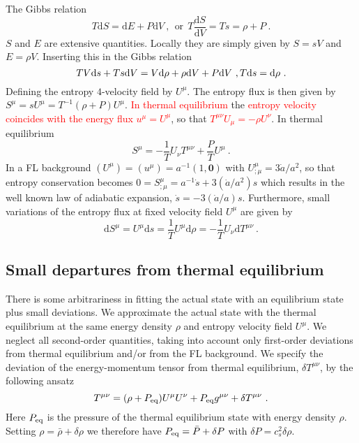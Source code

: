 \documentclass[11pt,a4paper]{article}
\renewcommand{\vec}[1]{\boldsymbol{#1}}
\newcommand{\dif}{\mathrm{d}}
\begin{document}
The Gibbs relation 
\begin{equation}
T \dif S = \dif E + P\dif V ~, ~~ \text{or} ~~ T \dfrac{\dif S}{\dif V} = T s = \rho +P ~.
\end{equation}
$S$ and $E$ are extensive quantities. Locally they are simply given by $S = s V$ and $E = \rho V$. Inserting this in the Gibbs relation
\begin{equation}
T V \dif s + Ts \dif V = V \dif \rho +\rho \dif V + P \dif V ~, \\
T \dif s = \dif \rho ~.
\end{equation}
Defining the entropy $4$-velocity field by $U^\mu$. The entropy flux is then given by $S^\mu  = sU^\mu = T^{-1}(\rho + P)U^\mu$. \textcolor{red}{In thermal equilibrium} the \textcolor{red}{entropy velocity coincides with the energy flux $u^\mu = U^\mu$}, so that \textcolor{red}{$T^{\mu\nu}U_\mu = -\rho U^\nu$}. In thermal equilibrium
\begin{equation}
S^\mu = -\dfrac{1}{T} U_\nu T^{\mu\nu} + \dfrac{P}{T} U^\mu ~.
\end{equation}
In a FL background $(U^\mu) = (u^\mu) = a^{-1}(1, \vec{0})$ with $U^\mu_{;\mu} = 3\dot{a}/a^2$, so that entropy conservation becomes $0 = S^\mu_{;\mu} = a^{-1} \dot{s} + 3(\dot{a}/a^2)s$ which results in the well known law of adiabatic expansion, $\dot{s} = -3(\dot{a}/a)s$. Furthermore, small variations of the entropy flux at fixed velocity field $U^\mu$ are given by
\begin{equation}
\dif S^\mu = U^\mu \dif s = \dfrac{1}{T} U^\mu \dif \rho = -\dfrac{1}{T} U_\nu \dif T^{\mu \nu} ~.
\end{equation}

\subsection{Small departures from thermal equilibrium}
There is some arbitrariness in fitting the actual state with an equilibrium state plus small deviations. We approximate the actual state with the thermal equilibrium at the same energy density $\rho$ and entropy velocity field $U^\mu$. We neglect all second-order quantities, taking into account only first-order deviations from thermal equilibrium and/or from the FL background. We specify the deviation of the energy-momentum tensor from thermal equilibrium, $\delta T^{\mu\nu}$, by the following ansatz
\begin{equation}
T^{\mu\nu} = (\rho +P_{\rm eq}) U^\mu U^\nu +P_{\rm eq} g^{\mu\nu} +\delta T^{\mu\nu} ~.
\label{eq:T_munu0}
\end{equation}
Here $P_{\rm eq}$ is the pressure of the thermal equilibrium state with energy density $\rho$. Setting $\rho = \bar{\rho} + \delta \rho$ we therefore have $P_{\rm eq} = \bar{P} + \delta P$ with $\delta P = c_s^2 \delta \rho$.
\end{document}
